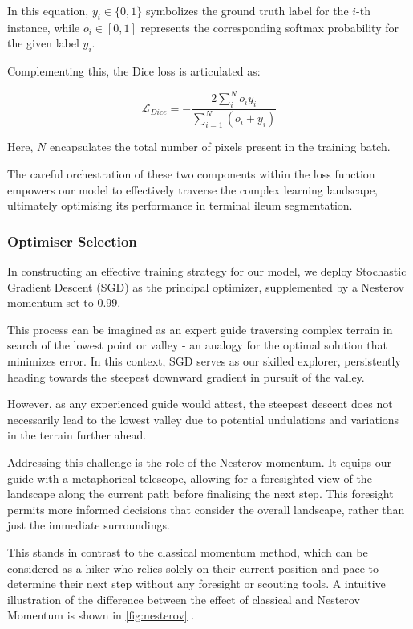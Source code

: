 In this equation, \(y_{i} \in \{ 0, 1 \}\) symbolizes the ground truth label for the \(i\)-th instance, while \(o_{i} \in \left[0, 1\right]\) represents the corresponding softmax probability for the given label \(y_{i}\).

Complementing this, the Dice loss is articulated as:

\[
\mathcal{L}_{Dice} = -\frac{2\sum_{i}^{N}o_{i}y_{i}}{\sum_{i=1}^{N}\left(o_{i} + y_{i}\right)}
\]

Here, \(N\) encapsulates the total number of pixels present in the training batch.

The careful orchestration of these two components within the loss function empowers our model to effectively traverse the complex learning landscape, ultimately optimising its performance in terminal ileum segmentation.

\subsubsection*{Optimiser Selection}

In constructing an effective training strategy for our model, we deploy Stochastic Gradient Descent (SGD) as the principal optimizer, supplemented by a Nesterov momentum set to 0.99.

This process can be imagined as an expert guide traversing complex terrain in search of the lowest point or valley - an analogy for the optimal solution that minimizes error. In this context, SGD serves as our skilled explorer, persistently heading towards the steepest downward gradient in pursuit of the valley.

However, as any experienced guide would attest, the steepest descent does not necessarily lead to the lowest valley due to potential undulations and variations in the terrain further ahead.

Addressing this challenge is the role of the Nesterov momentum. It equips our guide with a metaphorical telescope, allowing for a foresighted view of the landscape along the current path before finalising the next step. This foresight permits more informed decisions that consider the overall landscape, rather than just the immediate surroundings.

This stands in contrast to the classical momentum method, which can be considered as a hiker who relies solely on their current position and pace to determine their next step without any foresight or scouting tools. A intuitive illustration of the difference between the effect of classical and Nesterov Momentum is shown in \autoref{fig:nesterov} \cite{lectures16:online}.

